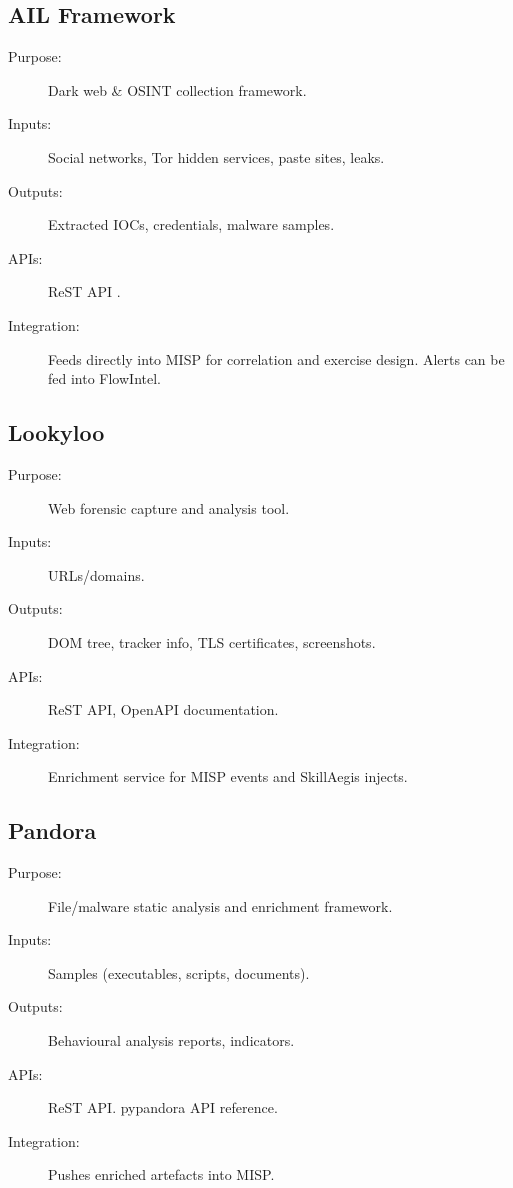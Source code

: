 \documentclass[10pt,a4paper]{report}
\begin{document}
\subsection{AIL Framework}
\begin{description}
  \item[Purpose:] Dark web \& OSINT collection framework.
  \item[Inputs:] Social networks, Tor hidden services, paste sites, leaks.
  \item[Outputs:] Extracted IOCs, credentials, malware samples.
  \item[APIs:] ReST API \cite{aopenapi}.
  \item[Integration:] Feeds directly into MISP for correlation and exercise
  design. Alerts can be fed into FlowIntel.
\end{description}

\subsection{Lookyloo}
\begin{description}
  \item[Purpose:] Web forensic capture and analysis tool.
  \item[Inputs:] URLs/domains.
  \item[Outputs:] DOM tree, tracker info, TLS certificates, screenshots.
  \item[APIs:] ReST API, OpenAPI documentation. \cite{lopenapi}
  \item[Integration:] Enrichment service for MISP events and SkillAegis
  injects.
\end{description}

\subsection{Pandora}
\begin{description}
  \item[Purpose:] File/malware static analysis and enrichment framework.
  \item[Inputs:] Samples (executables, scripts, documents).
  \item[Outputs:] Behavioural analysis reports, indicators.
  \item[APIs:] ReST API\cite{}. pypandora API reference\cite{papi}.
  \item[Integration:] Pushes enriched artefacts into MISP.
\end{description}
\end{document}
